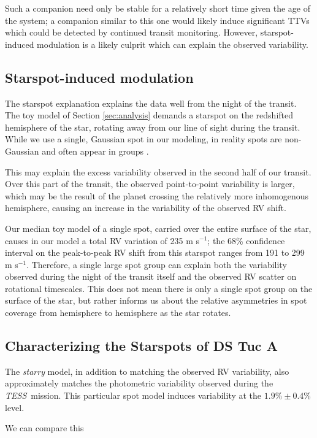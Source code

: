 \documentclass[twocolumn]{aastex62}
\newcommand{\tess}{{\it TESS}}
\begin{document}
Such a companion need only be stable for a relatively short time given the age of the system; a companion similar to this one would likely induce significant TTVs which could be detected by continued transit monitoring.
However, starspot-induced modulation is a likely culprit which can explain the observed variability.


\subsection{Starspot-induced modulation}

The starspot explanation explains the data well from the night of the transit.
The toy model of Section \ref{sec:analysis} demands a starspot on the redshifted hemisphere of the star, rotating away from our line of sight during the transit. 
While we use a single, Gaussian spot in our modeling, in reality spots are non-Gaussian and often appear in groups \citep[e.g.][]{Kilcik11}.

This may explain the excess variability observed in the second half of our transit. 
Over this part of the transit, the observed point-to-point variability is larger, which may be the result of the planet crossing the relatively more inhomogenous hemisphere, causing an increase in the variability of the observed RV shift.

Our median toy model of a single spot, carried over the entire surface of the star, causes in our model a total RV variation of 235 m s$^{-1}$; the 68\% confidence interval on the peak-to-peak RV shift from this starspot ranges from 191 to 299 m s$^{-1}$.
Therefore, a single large spot group can explain both the variability observed during the night of the transit itself and the observed RV scatter on rotational timescales.
This does not mean there is only a single spot group on the surface of the star, but rather informs us about the relative asymmetries in spot coverage from hemisphere to hemisphere as the star rotates.


\subsection{Characterizing the Starspots of DS Tuc A}
The \textit{starry} model, in addition to matching the observed RV variability, also approximately matches the photometric variability observed during the \tess\ mission. 
This particular spot model induces variability at the $1.9\% \pm 0.4\%$ level.

We can compare this 
\end{document}
